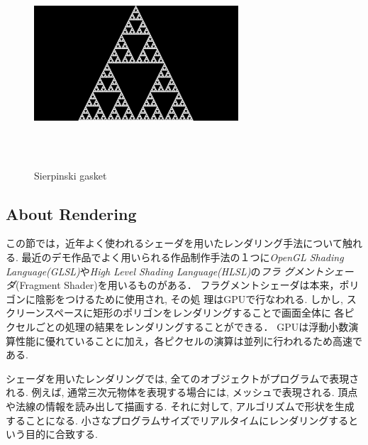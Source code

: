 \begin{figure}[htbp]
 \center
 \includegraphics[width=3in, height=3in, keepaspectratio]{../img/fractal/gasket.pdf}
 \caption{Sierpinski gasket}
 \label{fig:gasket}
\end{figure}

\subsection{About Rendering}

この節では，近年よく使われるシェーダを用いたレンダリング手法について触れる.
最近のデモ作品でよく用いられる作品制作手法の１つに\textit{OpenGL Shading
Language(GLSL)}や\textit{High Level Shading Language(HLSL)}の\emph{フラ
グメントシェーダ}(Fragment Shader)を用いるものがある．
フラグメントシェーダは本来，ポリゴンに陰影をつけるために使用され, その処
理はGPUで行なわれる.
しかし, スクリーンスペースに矩形のポリゴンをレンダリングすることで画面全体に
各ピクセルごとの処理の結果をレンダリングすることができる．
GPUは浮動小数演算性能に優れていることに加え，各ピクセルの演算は並列に行われるため高速である.

シェーダを用いたレンダリングでは, 全てのオブジェクトがプログラムで表現される.
例えば,  通常三次元物体を表現する場合には, メッシュで表現される.
頂点や法線の情報を読み出して描画する.
それに対して, アルゴリズムで形状を生成することになる.
小さなプログラムサイズでリアルタイムにレンダリングするという目的に合致する.

